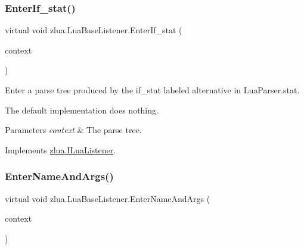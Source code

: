 \mbox{\label{classzlua_1_1_lua_base_listener_a6c6b8d7541116a14fcaf314180435d4b}} 
\subsubsection{\texorpdfstring{Enter\+If\+\_\+stat()}{EnterIf\_stat()}}
{\footnotesize\ttfamily virtual void zlua.\+Lua\+Base\+Listener.\+Enter\+If\+\_\+stat (\begin{DoxyParamCaption}\item[{\mbox{[}\+Not\+Null\mbox{]} \mbox{\hyperlink{classzlua_1_1_lua_parser_1_1_if__stat_context}{Lua\+Parser.\+If\+\_\+stat\+Context}}}]{context }\end{DoxyParamCaption})\hspace{0.3cm}{\ttfamily [virtual]}}



Enter a parse tree produced by the {\ttfamily if\+\_\+stat} labeled alternative in Lua\+Parser.\+stat. 

The default implementation does nothing.


\begin{DoxyParams}{Parameters}
{\em context} & The parse tree.\\
\hline
\end{DoxyParams}


Implements \mbox{\hyperlink{interfacezlua_1_1_i_lua_listener_ae4466707d78b9bb5f5836ed8710e4ef1}{zlua.\+I\+Lua\+Listener}}.

\mbox{\label{classzlua_1_1_lua_base_listener_a118e7bc8edc07875df5c564171a36084}} 
\subsubsection{\texorpdfstring{Enter\+Name\+And\+Args()}{EnterNameAndArgs()}}
{\footnotesize\ttfamily virtual void zlua.\+Lua\+Base\+Listener.\+Enter\+Name\+And\+Args (\begin{DoxyParamCaption}\item[{\mbox{[}\+Not\+Null\mbox{]} \mbox{\hyperlink{classzlua_1_1_lua_parser_1_1_name_and_args_context}{Lua\+Parser.\+Name\+And\+Args\+Context}}}]{context }\end{DoxyParamCaption})\hspace{0.3cm}{\ttfamily [virtual]}}



